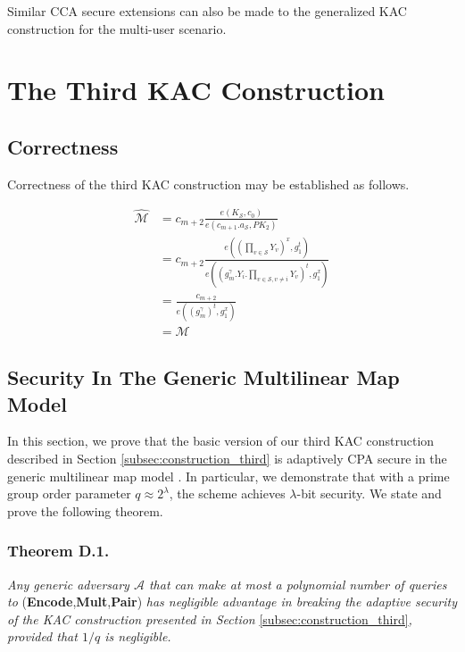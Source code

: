 Similar CCA secure extensions can also be made to the generalized KAC construction for the multi-user scenario.



\section{The Third KAC Construction}

\subsection{Correctness}
\label{app_sec:proof_correctness_3}

Correctness of the third KAC construction may be established as follows.

\begin{equation}
 \begin{split}
  \hat{\mathcal{M}}&=c_{m+2}\frac{{e}(K_{\mathcal{S}},c_0)}{{e}(c_{m+1}.a_{\mathcal{S}},PK_2)}\\
  &=c_{m+2}\frac{e\left(\left(\prod_{v\in\mathcal{S}}{Y_{v}}\right)^x,g^{t}_1\right)}{e\left(\left(g^{\gamma}_m.{Y_i}.\prod_{v\in\mathcal{S},v\neq i}Y_{v}\right)^{t},g^x_1\right)}\\
  &=\frac{c_{m+2}}{e(\left(g^{\gamma}_m\right)^{t},g^{x}_1)}\\
  &=\mathcal{M}\nonumber
 \end{split}
\end{equation}


\subsection{Security In The Generic Multilinear Map Model}
\label{app_sec:proofgeneric}

In this section, we prove that the basic version of our third KAC construction described in Section \ref{subsec:construction_third} is adaptively CPA secure in the generic multilinear map model . In particular, we demonstrate that with a prime group order parameter $q\approx 2^{\lambda}$, the scheme achieves $\lambda$-bit security. We state and prove the following theorem.

\subsubsection{Theorem D.1.} \textit{Any generic adversary $\mathcal{A}$ that can make at most a polynomial number of queries to} (\textbf{Encode},\textbf{Mult},\textbf{Pair}) \textit{has negligible advantage in breaking the adaptive security of the KAC construction presented in Section} \ref{subsec:construction_third}\textit{, provided that $1/q$ is negligible.}

